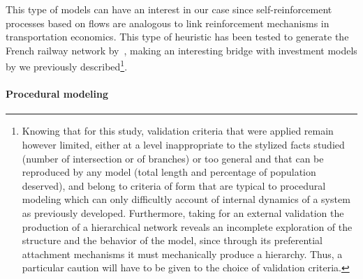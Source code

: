 \documentclass[galley]{jtlu-article-2col}
\begin{document}
This type of models can have an interest in our case since self-reinforcement processes based on flows are analogous to link reinforcement mechanisms in transportation economics. This type of heuristic has been tested to generate the French railway network by~\cite{mimeur:tel-01451164}, making an interesting bridge with investment models by  we previously described\footnote{Knowing that for this study, validation criteria that were applied remain however limited, either at a level inappropriate to the stylized facts studied (number of intersection or of branches) or too general and that can be reproduced by any model (total length and percentage of population deserved), and belong to criteria of form that are typical to procedural modeling which can only difficultly account of internal dynamics of a system as previously developed. Furthermore, taking for an external validation the production of a hierarchical network reveals an incomplete exploration of the structure and the behavior of the model, since through its preferential attachment mechanisms it must mechanically produce a hierarchy. Thus, a particular caution will have to be given to the choice of validation criteria.}.


\paragraph{Procedural modeling}
\end{document}
